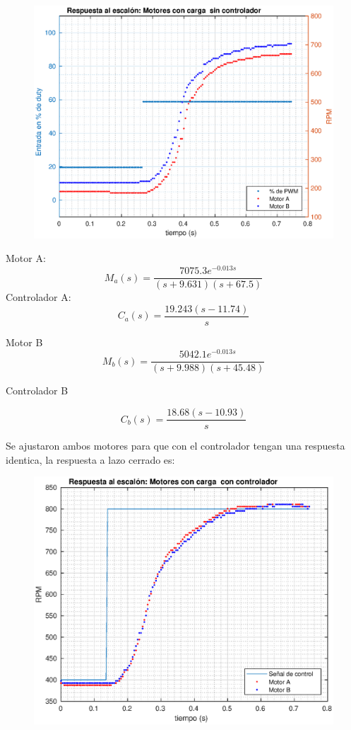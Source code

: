 \documentclass[10pt,conference,a4paper,onecolumn]{article}%
\begin{document}
\begin{figure}[h]
\centering
\includegraphics[width=15cm]{./imagenes/resp_escalon_motores_2}
\end{figure}
Motor A:
\begin{equation}
M_a(s)= \frac{7075.3 e^{-0.013s}}{(s+9.631)(s+67.5)}
\end{equation}
Controlador A:
\begin{equation}
C_a(s)= \frac{  19.243 (s-11.74)}{s}
\end{equation}


Motor B
\begin{equation}
M_b(s)= \frac{5042.1 e^{-0.013s}}{(s+9.988) (s+45.48)}
\end{equation}

Controlador B

\begin{equation}
C_b(s)= \frac{ 18.68 (s-10.93)}{s}
\end{equation}


Se ajustaron ambos motores para que con el controlador tengan una respuesta identica, la respuesta a lazo cerrado es:
\begin{figure}[h]
\centering
\includegraphics[width=15cm]{./imagenes/resp_escalon_motores_controlados_2}
\end{figure}
\end{document}
